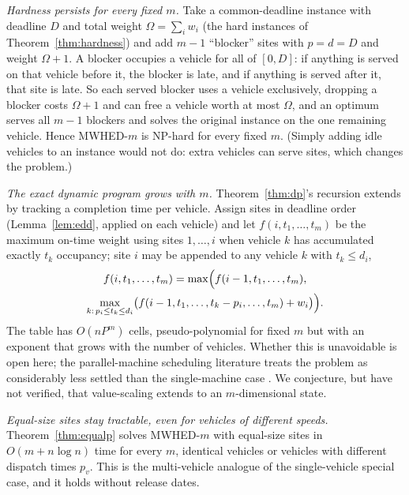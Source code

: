 \documentclass[pdflatex,sn-mathphys-ay]{sn-jnl}
\theoremstyle{thmstyleone}
\theoremstyle{thmstyletwo}
\theoremstyle{thmstylethree}
\begin{document}
\emph{Hardness persists for every fixed $m$.} Take a common-deadline
instance with deadline $D$ and total weight $\Omega=\sum_iw_i$ (the
hard instances of Theorem~\ref{thm:hardness}) and add $m-1$ ``blocker''
sites with $p=d=D$ and weight $\Omega+1$. A blocker occupies a vehicle
for all of $[0,D]$: if anything is served on that vehicle before it, the
blocker is late, and if anything is served after it, that site is late.
So each served blocker uses a vehicle exclusively, dropping a blocker
costs $\Omega+1$ and can free a vehicle worth at most $\Omega$, and an
optimum serves all $m-1$ blockers and solves the original instance on the
one remaining vehicle. Hence MWHED-$m$ is NP-hard for every fixed $m$.
(Simply adding idle vehicles to an instance would not do: extra vehicles
can serve sites, which changes the problem.)

\emph{The exact dynamic program grows with $m$.} Theorem~\ref{thm:dp}'s
recursion extends by tracking a completion time per vehicle. Assign sites
in deadline order (Lemma~\ref{lem:edd}, applied on each vehicle) and let
$f(i,t_1,\dots,t_m)$ be the maximum on-time weight using sites
$1,\dots,i$ when vehicle $k$ has accumulated exactly $t_k$ occupancy;
site $i$ may be appended to any vehicle $k$ with $t_k\le d_i$,
\begin{multline*}
f(i,t_1,\dots,t_m)=\max\Bigl(f(i-1,t_1,\dots,t_m),\\
\max_{k:\,p_i\le t_k\le d_i}
\bigl(f(i-1,t_1,\dots,t_k-p_i,\dots,t_m)+w_i\bigr)\Bigr).
\end{multline*}
The table has $O(nP^m)$ cells, pseudo-polynomial for fixed $m$ but with
an exponent that grows with the number of vehicles. Whether this is
unavoidable is open here; the parallel-machine scheduling literature
treats the problem as considerably less settled than the single-machine
case \citep{lenstra1977}. We conjecture, but have not verified, that
value-scaling extends to an $m$-dimensional state.

\emph{Equal-size sites stay tractable, even for vehicles of different
speeds.} Theorem~\ref{thm:equalp} solves MWHED-$m$ with equal-size sites
in $O(m+n\log n)$ time for every $m$, identical vehicles or vehicles with
different dispatch times $p_v$. This is the multi-vehicle analogue of the
single-vehicle special case, and it holds without release dates.
\end{document}
